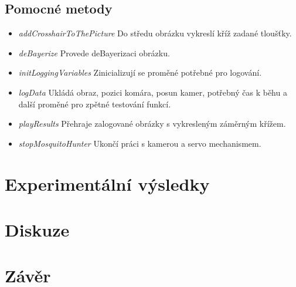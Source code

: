 \documentclass[a4paper,10pt]{article}
\begin{document}

\subsection{Pomocné metody}

\begin{itemize}
 \item \textit{addCrosshairToThePicture} Do středu obrázku vykreslí kříž zadané tloušťky. 
 \item \textit{deBayerize} Provede deBayerizaci obrázku.
\item \textit{initLoggingVariables} Zinicializují se proměné potřebné pro logování.
 \item \textit{logData} Ukládá obraz, pozici komára, posun kamer, potřebný čas k běhu a další proměné pro zpětné testování funkcí.
\item \textit{playResults} Přehraje zalogované obrázky s vykresleným záměrným křížem.
\item \textit{stopMosquitoHunter} Ukončí práci s kamerou a servo mechanismem.

\end{itemize}

\section{Experimentální výsledky}


\section{Diskuze}
\section{Závěr}
\end{document}
